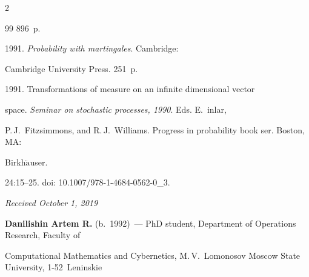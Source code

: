 \begin{multicols}{2}
{{\begin{thebibliography}{99}
896~p.




 1991. \textit{Probability with martingales}. Cambridge: 


Cambridge University Press. 251~p.




 1991. Transformations of measure on an infinite dimensional vector 


space. \textit{Seminar on stochastic processes, 1990}. Eds. \mbox{E.~{}inlar}, 


P.\,J.~Fitzsimmons, and R.\,J.~Williams. Progress in probability book ser. Boston, MA: 


Birkh$\ddot{\mbox{a}}$user. 


24:15--25. doi: 10.1007/978-1-4684-0562-0\_3.


\end{thebibliography}





 }


 }





\end{multicols}





\vspace*{-3pt}





\hfill{\small\textit{Received October 1, 2019}}


















\Contr





\noindent


\textbf{Danilishin Artem R.} (b.\ 1992)~--- PhD student, Department of Operations Research, Faculty of 


Computational Mathematics and Cybernetics, M.\,V.~Lomonosov Moscow State University, 1-52~Leninskie 



